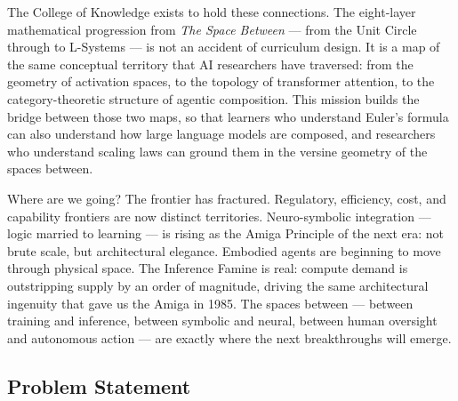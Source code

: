 \documentclass[11pt,letterpaper]{article}
\begin{document}
The College of Knowledge exists to hold these connections. The eight-layer mathematical progression from \textit{The Space Between} — from the Unit Circle through to L-Systems — is not an accident of curriculum design. It is a map of the same conceptual territory that AI researchers have traversed: from the geometry of activation spaces, to the topology of transformer attention, to the category-theoretic structure of agentic composition. This mission builds the bridge between those two maps, so that learners who understand Euler's formula can also understand how large language models are composed, and researchers who understand scaling laws can ground them in the versine geometry of the spaces between.

Where are we going? The frontier has fractured. Regulatory, efficiency, cost, and capability frontiers are now distinct territories. Neuro-symbolic integration — logic married to learning — is rising as the Amiga Principle of the next era: not brute scale, but architectural elegance. Embodied agents are beginning to move through physical space. The Inference Famine is real: compute demand is outstripping supply by an order of magnitude, driving the same architectural ingenuity that gave us the Amiga in 1985. The spaces between — between training and inference, between symbolic and neural, between human oversight and autonomous action — are exactly where the next breakthroughs will emerge.

\subsection{Problem Statement}
\end{document}
